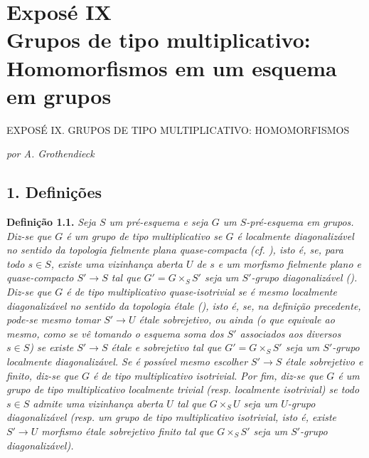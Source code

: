 
\chapter*{Exposé IX\\
Grupos de tipo multiplicativo:\\
Homomorfismos em um esquema em grupos}
  {EXPOSÉ IX. GRUPOS DE TIPO MULTIPLICATIVO: HOMOMORFISMOS}

\begin{center}
  \textit{por A. Grothendieck}
\end{center}

\section*{1. Definições}

\medskip
\noindent{}\textbf{Definição 1.1.}
\textit{Seja \(S\) um pré-esquema e seja \(G\) um \(S\)-pré-esquema
em grupos. Diz-se que \(G\) é um grupo \emph{de tipo multiplicativo}
se \(G\) é localmente diagonalizável no sentido da topologia fielmente
plana quase-compacta (cf. ),
isto é, se, para todo \(s\in S\), existe uma vizinhança aberta \(U\)
de \(s\) e um morfismo fielmente plano e quase-compacto \(S'\to S\)
tal que \(G'=G\times_S S'\) seja um \(S'\)-grupo diagonalizável
(). Diz-se que \(G\) é de tipo
multiplicativo \emph{quase-isotrivial} se é mesmo localmente
diagonalizável no sentido da topologia étale
(), isto é, se, na definição
precedente, pode-se mesmo tomar \(S'\to U\) étale sobrejetivo, ou ainda
(o que equivale ao mesmo, como se vê tomando o esquema soma dos \(S'\)
associados aos diversos \(s\in S\)) se existe \(S'\to S\) étale e
sobrejetivo tal que \(G'=G\times_S S'\) seja um \(S'\)-grupo localmente
diagonalizável. Se é possível mesmo escolher \(S'\to S\) étale
sobrejetivo e finito, diz-se que \(G\) é de tipo multiplicativo
\emph{isotrivial}. Por fim, diz-se que \(G\) é um grupo de tipo
multiplicativo \emph{localmente trivial} (resp. \emph{localmente
isotrivial}) se todo \(s\in S\) admite uma vizinhança aberta \(U\)
tal que \(G\times_S U\) seja um \(U\)-grupo diagonalizável (resp. um
grupo de tipo multiplicativo isotrivial, isto é, existe \(S'\to U\)
morfismo étale sobrejetivo finito tal que \(G\times_S S'\) seja um
\(S'\)-grupo diagonalizável).}

